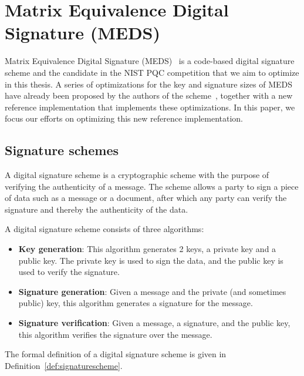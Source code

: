 \documentclass[11pt,a4paper]{report}
\theoremstyle{definition}
\begin{document}
\section{Matrix Equivalence Digital Signature (MEDS)}
\label{sec:meds}
Matrix Equivalence Digital Signature (MEDS)~\cite{chou2023take} is a code-based digital signature scheme and the candidate in the NIST PQC competition that we aim to optimize in this thesis. A series of optimizations for the key and signature sizes of MEDS have already been proposed by the authors of the scheme~\cite{chou2024reducing}, together with a new reference implementation that implements these optimizations. In this paper, we focus our efforts on optimizing this new reference implementation.

\subsection{Signature schemes}
\label{sec:signatureschemes}
A digital signature scheme is a cryptographic scheme with the purpose of verifying the authenticity of a message. The scheme allows a party to sign a piece of data such as a message or a document, after which any party can verify the signature and thereby the authenticity of the data.

A digital signature scheme consists of three algorithms:
\begin{itemize}
  \item \textbf{Key generation}: This algorithm generates 2 keys, a private key and a public key. The private key is used to sign the data, and the public key is used to verify the signature.
  \item \textbf{Signature generation}: Given a message and the private (and sometimes public) key, this algorithm generates a signature for the message.
  \item \textbf{Signature verification}: Given a message, a signature, and the public key, this algorithm verifies the signature over the message.
\end{itemize}
The formal definition of a digital signature scheme is given in Definition~\ref{def:signaturescheme}.
\end{document}
